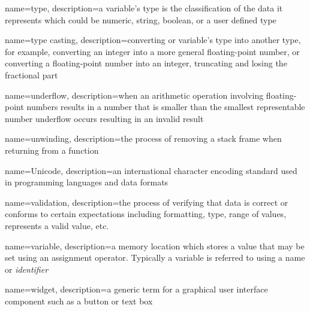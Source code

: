 {
  name=type,
  description={a variable's type is the classification of the data it represents which could be numeric, string, boolean, or
  	a user defined type}
}

{
  name=type casting,
  description={converting or variable's type into another type, for example, converting an integer into a more general floating-point number, or
  	converting a floating-point number into an integer, truncating and losing the fractional part}
}

{
  name=underflow,
  description={when an arithmetic operation involving floating-point numbers results in a number that is smaller than the smallest representable
  number underflow occurs resulting in an invalid result}
}

{
  name=unwinding,
  description={the process of removing a stack frame when returning from a function}
}

{
  name=Unicode,
  description={an international character encoding standard used in programming languages and data formats}
}

{
  name=validation,
  description={the process of verifying that data is correct or conforms to certain expectations including formatting, type, range of values,
  	represents a valid value, etc.}
}

{
  name=variable,
  description={a memory location which stores a value that may be set using an assignment operator.  Typically a variable
  	is referred to using a name or \emph{identifier}}
}

{
  name=widget,
  description={a generic term for a graphical user interface component such as a button or text box}
}







